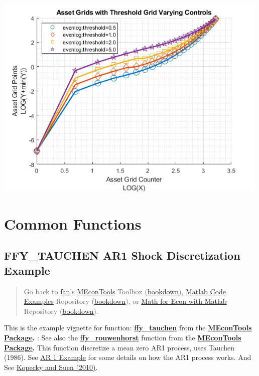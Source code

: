 \documentclass[
]{book}
\begin{document}
\includegraphics[width=5.20833in,height=\textheight]{img/fx_saveborr_grid_images/figure_7.png}

\hypertarget{common-functions}{%
\chapter{Common Functions}\label{common-functions}}

\hypertarget{ffy_tauchen-ar1-shock-discretization-example}{%
\section{FFY\_TAUCHEN AR1 Shock Discretization Example}\label{ffy_tauchen-ar1-shock-discretization-example}}

\begin{quote}
Go back to \href{http://fanwangecon.github.io/}{fan}'s \href{https://fanwangecon.github.io/MEconTools/}{MEconTools} Toolbox (\href{https://fanwangecon.github.io/MEconTools/bookdown}{bookdown}), \href{https://fanwangecon.github.io/M4Econ/}{Matlab Code Examples} Repository (\href{https://fanwangecon.github.io/M4Econ/bookdown}{bookdown}), or \href{https://fanwangecon.github.io/Math4Econ/}{Math for Econ with Matlab} Repository (\href{https://fanwangecon.github.io/Math4Econ/bookdown}{bookdown}).
\end{quote}

This is the example vignette for function:
\href{https://github.com/FanWangEcon/MEconTools/blob/master/MEconTools/external/stats/ffy_tauchen.m}{\textbf{ffy\_tauchen}}
from the \href{https://fanwangecon.github.io/MEconTools/}{\textbf{MEconTools
Package}}\textbf{.} : See also
the
\href{https://github.com/FanWangEcon/MEconTools/blob/master/MEconTools/external/stats/ffy_rouwenhorst.m}{\textbf{ffy\_rouwenhorst}}
function from the \href{https://fanwangecon.github.io/MEconTools/}{\textbf{MEconTools
Package}}\textbf{.} This function
discretize a mean zero AR1 process, uses Tauchen (1986). See \href{https://fanwangecon.github.io/M4Econ/panel/timeseries/htmlpdfm/fs_autoregressive.html}{AR 1
Example}
for some details on how the AR1 process works. And See \href{https://doi.org/10.1016/j.red.2010.02.002}{Kopecky and Suen
(2010)}.
\end{document}
